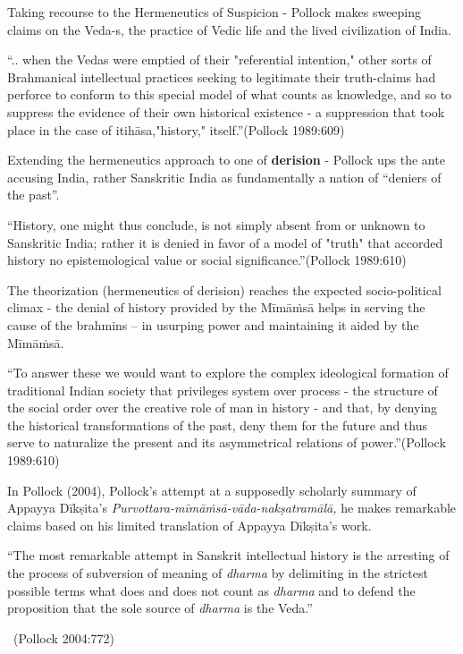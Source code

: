Taking recourse to the Hermeneutics of Suspicion - Pollock makes sweeping claims on the Veda-s, the practice of Vedic life and the lived civilization of India.

\begin{myquote}
“.. when the Vedas were emptied of their "referential intention," other sorts of Brahmanical intellectual practices seeking to legitimate their truth-claims had perforce to conform to this special model of what counts as knowledge, and so to suppress the evidence of their own historical existence - a suppression that took place in the case of itihāsa,"history," itself.”\hfill (Pollock 1989:609)
\end{myquote}

Extending the hermeneutics approach to one of \textbf{derision }- Pollock ups the ante accusing India, rather Sanskritic India as fundamentally a nation of “deniers of the past”.

\begin{myquote}
“History, one might thus conclude, is not simply absent from or unknown to Sanskritic India; rather it is denied in favor of a model of "truth" that accorded history no epistemological value or social significance.”\hfill (Pollock 1989:610)
\end{myquote}

The theorization (hermeneutics of derision) reaches the expected socio-political climax - the denial of history provided by the Mīmāṁsā helps in serving the cause of the brahmins – in usurping power and maintaining it aided by the Mīmāṁsā.

\begin{myquote}
“To answer these we would want to explore the complex ideological formation of traditional Indian society that privileges system over process - the structure of the social order over the creative role of man in history - and that, by denying the historical transformations of the past, deny them for the future and thus serve to naturalize the present and its asymmetrical relations of power.”\hfill (Pollock 1989:610)
\end{myquote}

In Pollock (2004), Pollock’s attempt at a supposedly scholarly summary of Appayya Dīkṣita’s \textit{Purvottara-mīmāṁsā-vāda-nakṣatramālā,} he makes remarkable claims based on his limited translation of Appayya Dīkṣita’s work.

\begin{myquote}
“The most remarkable attempt in Sanskrit intellectual history is the arresting of the process of subversion of meaning of \textit{dharma} by delimiting in the strictest possible terms what does and does not count as \textit{dharma} and to defend the proposition that the sole source of \textit{dharma} is the Veda.”

~\hfill (Pollock 2004:772)
\end{myquote}

